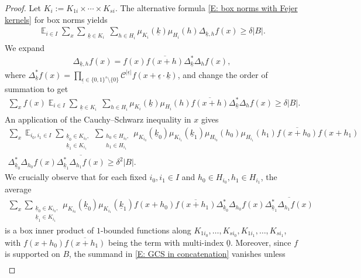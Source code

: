 \documentclass[11pt]{amsart}
\theoremstyle{definition}
\DeclareMathOperator*{\E}{\mathbb{E}}
\newcommand{\CC}{{\mathcal C}}
\newcommand{\uk}{{\underline{k}}}
\newcommand{\ueps}{{\underline{\epsilon}}}
\begin{document}
\begin{proof}
Let $K_i:=K_{1i}\times \cdots \times K_{si}$.
    The alternative formula \eqref{E: box norms with Fejer kernels} for box norms yields
    \begin{align*}
        \E_{i\in I} \sum_x \sum_{\substack{\uk \in K_i}}\sum_{h\in H_i}\mu_{K_i}(\uk) \mu_{H_i}(h) \Delta_{\uk, h}f(x) \geq \delta |B|.
    \end{align*}
    We expand
    \begin{align*}
        \Delta_{\uk, h} f(x) = f(x) \overline{f(x+h)} \Delta_{\uk}^*\Delta_{h} f(x), 
    \end{align*}
    where $\Delta_{\uk}^* f(x) = \prod_{\ueps\in\{0,1\}^s\setminus\{0\}}\CC^{|\ueps|}f(x+\ueps\cdot\uk)$,
    and change 
    the order of summation to get
    \begin{align*}
        \sum_{x} f(x) \E_{i\in I} \sum_{\substack{\uk \in K_i}}\sum_{h\in H_i}\mu_{K_i}(\uk) \mu_{H_i}(h) \overline{f(x+h)} \Delta^*_{\uk}\Delta_{h} f(x)\geq \delta |B|.
    \end{align*}
    An application of the Cauchy--Schwarz inequality in $x$ gives
    \begin{align*}
        \sum_x \E_{i_0, i_1\in I} \sum_{\substack{\uk_0\in K_{i_0},\\ \uk_1\in K_{i_1}}}\sum_{\substack{h_0\in H_{i_0},\\ h_1\in H_{i_1}}}  \mu_{K_{i_0}}(\uk_0) \mu_{K_{i_1}}(\uk_1) \mu_{H_{i_0}}(h_0) \mu_{H_{i_1}}(h_1)
        \overline{f(x+h_0)}f(x+h_1)\\
        \Delta^*_{\uk_0}\Delta_{h_0} f(x)\overline{\Delta^*_{\uk_1}\Delta_{h_1} f(x)}\geq \delta^2 |B|.
    \end{align*}
    We crucially observe that for each fixed $i_0,i_1\in I$ and $h_0\in H_{i_0}, h_1\in H_{i_1}$, the average
    \begin{align}\label{E: GCS in concatenation}
        \sum_x \sum_{\substack{\uk_0\in K_{i_0},\\ \uk_1\in K_{i_1}}}\mu_{K_{i_0}}(\uk_0) \mu_{K_{i_1}}(\uk_1)
        f(x+h_0)\overline{f(x+h_1)}
        \Delta^*_{\uk_0}\Delta_{h_0} f(x)\overline{\Delta^*_{\uk_1}\Delta_{h_1} f(x)}
    \end{align}
    is a box inner product of $1$-bounded functions along $K_{1i_0}, \ldots, K_{si_0}, K_{1i_1}, \ldots, K_{si_1}$, with $f(x+h_0)\overline{f(x+h_1)}$ being the term with multi-index $\underline{0}$. Moreover, since $f$ is supported on $B$, the summand in \eqref{E: GCS in concatenation} vanishes unless
    \begin{align*}

\end{align*}
\end{proof}
\end{document}

